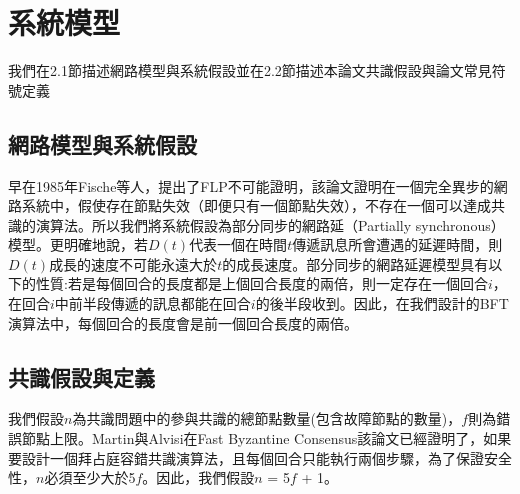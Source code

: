 \chapter{系統模型}\label{se_2}
我們在2.1節描述網路模型與系統假設並在2.2節描述本論文共識假設與論文常見符號定義
\section{網路模型與系統假設}\label{se_2} 

早在1985年Fische等人，提出了FLP不可能證明\cite{fischer1982impossibility}，該論文證明在一個完全異步的網路系統中，假使存在節點失效（即便只有一個節點失效），不存在一個可以達成共識的演算法。所以我們將系統假設為部分同步的網路延（Partially synchronous）模型。更明確地說，若$D(t)$代表一個在時間$t$傳遞訊息所會遭遇的延遲時間，則$D(t)$成長的速度不可能永遠大於$t$的成長速度。部分同步的網路延遲模型具有以下的性質:若是每個回合的長度都是上個回合長度的兩倍，則一定存在一個回合$i$，在回合$i$中前半段傳遞的訊息都能在回合$i$的後半段收到。因此，在我們設計的BFT演算法中，每個回合的長度會是前一個回合長度的兩倍。

\section{共識假設與定義}\label{se_2} 

我們假設$n$為共識問題中的參與共識的總節點數量(包含故障節點的數量)，$f$則為錯誤節點上限。Martin與Alvisi在Fast Byzantine Consensus該論文\cite{martin2006fast}已經證明了，如果要設計一個拜占庭容錯共識演算法，且每個回合只能執行兩個步驟，為了保證安全性，$n$必須至少大於5$f$。因此，我們假設$n$ = 5$f$ + 1。

